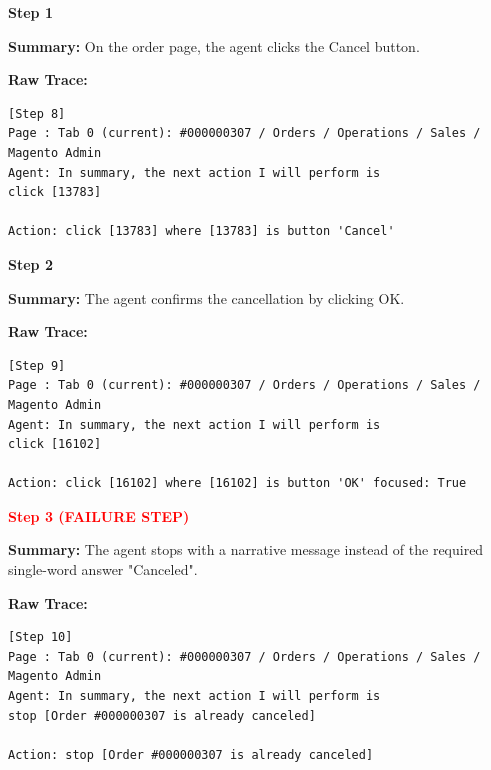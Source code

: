 \documentclass[11pt]{article}
\begin{document}
\begin{tcolorbox}[
breakable,
colback=customwhite,
colframe=custompurple,
title=Instruction,
fontupper=\fontfamily{pcr}\selectfont\scriptsize
]

\textbf{Step 1}

\textbf{Summary:}  
On the order page, the agent clicks the Cancel button.

\textbf{Raw Trace:}
\begin{verbatim}
[Step 8]
Page : Tab 0 (current): #000000307 / Orders / Operations / Sales / Magento Admin
Agent: In summary, the next action I will perform is
click [13783]

Action: click [13783] where [13783] is button 'Cancel'
\end{verbatim}

\medskip
\textbf{Step 2}

\textbf{Summary:}  
The agent confirms the cancellation by clicking OK.

\textbf{Raw Trace:}
\begin{verbatim}
[Step 9]
Page : Tab 0 (current): #000000307 / Orders / Operations / Sales / Magento Admin
Agent: In summary, the next action I will perform is
click [16102]

Action: click [16102] where [16102] is button 'OK' focused: True
\end{verbatim}

\medskip
\textbf{\textcolor{red}{Step 3 (FAILURE STEP)}}

\textbf{Summary:}  
The agent stops with a narrative message instead of the required single-word answer "Canceled".

\textbf{Raw Trace:}
\begin{verbatim}
[Step 10]
Page : Tab 0 (current): #000000307 / Orders / Operations / Sales / Magento Admin
Agent: In summary, the next action I will perform is
stop [Order #000000307 is already canceled]

Action: stop [Order #000000307 is already canceled]
\end{verbatim}

\end{tcolorbox}

\clearpage
\end{document}
